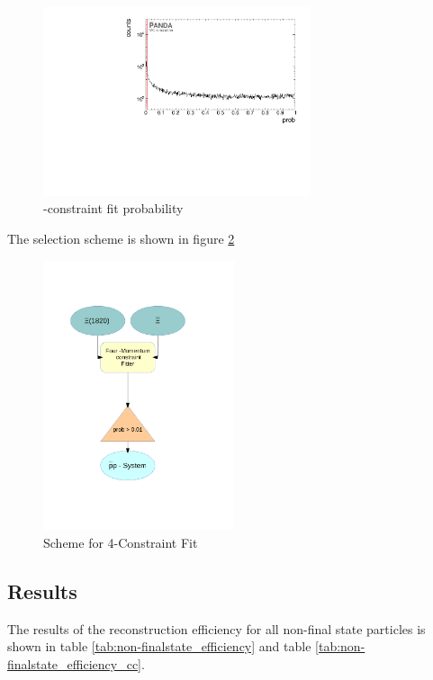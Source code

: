 	\begin{figure}
		\centering
		\includegraphics[width=0.7\textwidth]{./plots/pbarp/XiSys_prob.pdf}
		\caption{-constraint fit probability}
		\label{fig:xisys_prob}
	\end{figure}
	
	The selection scheme is shown in figure \ref{fig:fourconstraintfit}
	 
	\begin{figure}
		\centering
			\includegraphics[width=0.50\textwidth]{./plots/combineCascadeSys.pdf}
		\caption{\propose Scheme for 4-Constraint Fit}
		\label{fig:fourconstraintfit}
	\end{figure}
	
	\subsection*{Results}
	
	The results of the reconstruction efficiency for all non-final state particles is shown in table \ref{tab:non-finalstate_efficiency}
	and table \ref{tab:non-finalstate_efficiency_cc}.
	
